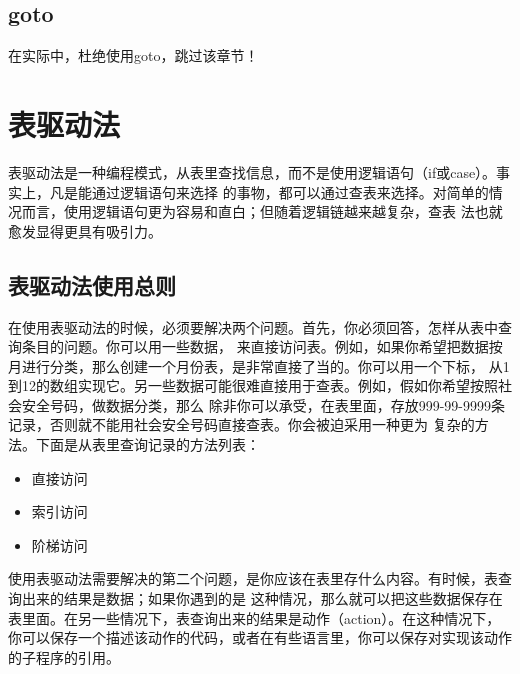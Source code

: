\documentclass{article}
\begin{document}
\subsection{goto}
在实际中，杜绝使用goto，跳过该章节！

\section{表驱动法}
表驱动法是一种编程模式，从表里查找信息，而不是使用逻辑语句（if或case）。事实上，凡是能通过逻辑语句来选择
的事物，都可以通过查表来选择。对简单的情况而言，使用逻辑语句更为容易和直白；但随着逻辑链越来越复杂，查表
法也就愈发显得更具有吸引力。
\subsection{表驱动法使用总则}
在使用表驱动法的时候，必须要解决两个问题。首先，你必须回答，怎样从表中查询条目的问题。你可以用一些数据，
来直接访问表。例如，如果你希望把数据按月进行分类，那么创建一个月份表，是非常直接了当的。你可以用一个下标，
从1到12的数组实现它。另一些数据可能很难直接用于查表。例如，假如你希望按照社会安全号码，做数据分类，那么
除非你可以承受，在表里面，存放999-99-9999条记录，否则就不能用社会安全号码直接查表。你会被迫采用一种更为
复杂的方法。下面是从表里查询记录的方法列表：
\begin{itemize}
    \item 直接访问
    \item 索引访问
    \item 阶梯访问
\end{itemize}
使用表驱动法需要解决的第二个问题，是你应该在表里存什么内容。有时候，表查询出来的结果是数据；如果你遇到的是
这种情况，那么就可以把这些数据保存在表里面。在另一些情况下，表查询出来的结果是动作（action）。在这种情况下，
你可以保存一个描述该动作的代码，或者在有些语言里，你可以保存对实现该动作的子程序的引用。
\end{document}
